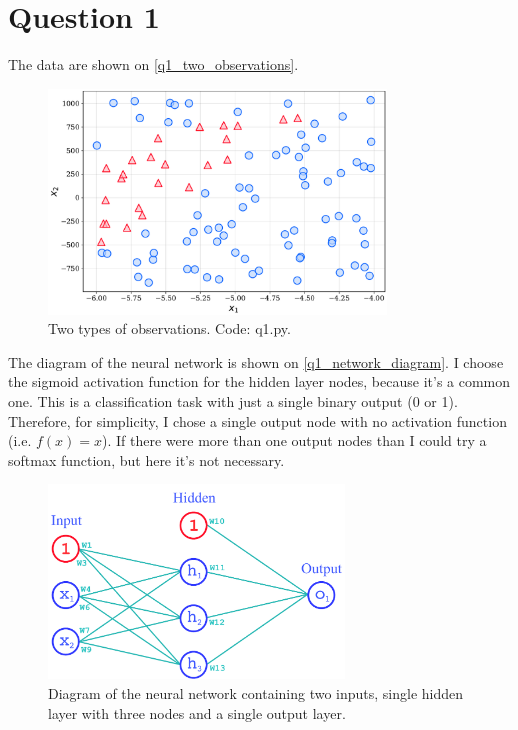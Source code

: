 \section{Question 1}

The data are shown on \autoref{q1_two_observations}.

\begin{figure}[!ht]
  \centering
  \includegraphics[width=0.8\textwidth]{figures/q1.pdf}
  \caption{Two types of observations. Code: q1.py.}
  \label{q1_two_observations}
\end{figure}

The diagram of the neural network is shown on \autoref{q1_network_diagram}. I choose the sigmoid activation function for the hidden layer nodes, because it's a common one. This is a classification task with just a single binary output (0 or 1). Therefore, for simplicity, I chose a single output node with no activation function (i.e. $f(x) = x$). If there were more than one output nodes than I could try a softmax function, but here it's not necessary.

\begin{figure}[!ht]
  \centering
  \includegraphics[width=0.7\textwidth]{figures/q1_neural_network.pdf}
  \caption{Diagram of the neural network containing two inputs, single hidden layer with three nodes and a single output layer.}
  \label{q1_network_diagram}
\end{figure}


